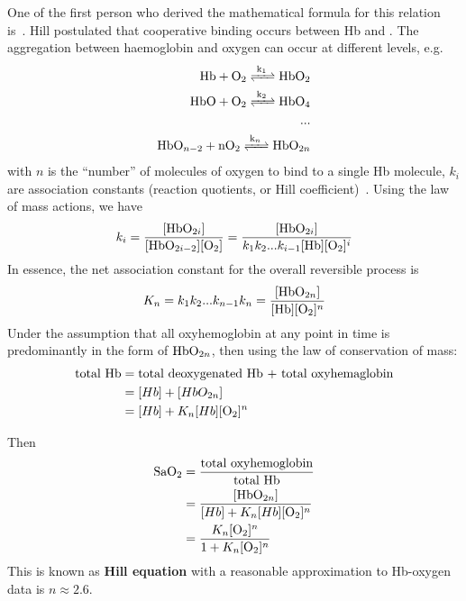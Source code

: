 
One of the first person who derived the mathematical formula for this
relation is~\citep{hill1910pea}. Hill postulated that
cooperative binding occurs between Hb and . The aggregation
between haemoglobin and oxygen can occur at different levels, e.g.
\begin{equation}
  \label{eq:302}
  \begin{split}
    \ce{Hb + O2 <=>[k_1] HbO2} \\
    \ce{HbO + O2 <=>[k_2] HbO4} \\
    ... \\
    \ce{HbO_{n-2} + nO2 <=>[k_n] HbO_{2n}}
  \end{split}
\end{equation}
with $n$ is the ``number'' of molecules of oxygen to bind to a single
Hb molecule, $k_i$ are association constants (reaction
quotients, or Hill coefficient)~\citep{leow2007odc}. Using the law of mass actions, we have
\begin{equation}
  \label{eq:305}
  k_i = \frac{[\ce{HbO_{2i}]}}{[\ce{HbO_{2i-2}}][\ce{O2}]} = 
  \frac{[\ce{HbO_{2i}]}}{k_1k_2...k_{i-1}[\ce{Hb}][\ce{O2}]^{i}} 
\end{equation}
In essence, the net association constant for the overall reversible
process is
\begin{equation}
  \label{eq:306}
  K_n =k_1k_2...k_{n-1}k_n= \frac{[\ce{HbO_{2n}]}}{[\ce{Hb}][\ce{O2}]^{n}} 
\end{equation}
Under the assumption that all oxyhemoglobin at any point in time is
predominantly in the form of $\ce{HbO_{2n}}$, then using the law of
conservation of mass: 
\begin{equation}
  \label{eq:307}
  \begin{split}
    \text{total Hb} &= \text{total deoxygenated Hb + total
      oxyhemaglobin} \\
    &= [Hb] + [HbO_{2n}] \\
    &= [Hb] + K_n[Hb][\ce{O2}]^n
  \end{split}
\end{equation}

Then
\begin{equation}
  \label{eq:308}
  \begin{split}
    \ce{SaO2} &= \frac{\text{total oxyhemoglobin}}{\text{total Hb}} \\
    &= \frac{[\ce{HbO_{2n}}]}{ [Hb] + K_n[Hb][\ce{O2}]^n} \\
    &= \frac{K_n[\ce{O2}]^n}{ 1 + K_n[\ce{O2}]^n}
  \end{split}
\end{equation}
This is known as {\bf Hill equation} with a reasonable approximation
to Hb-oxygen data is $n\approx 2.6$. 

